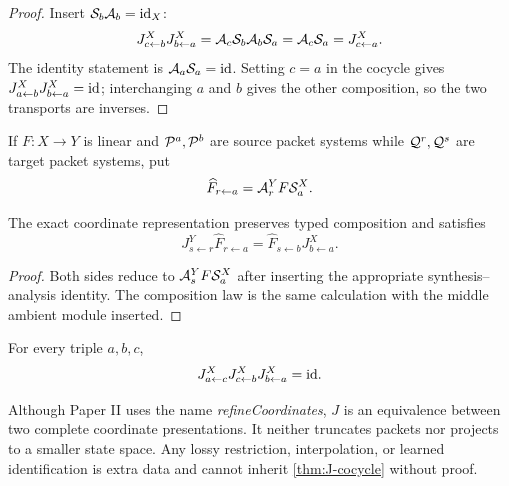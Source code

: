 \begin{proof}
Insert $\mathcal S_b\mathcal A_b=\mathrm{id}_X$:
\[
J^X_{c\leftarrow b}J^X_{b\leftarrow a}
=\mathcal A_c\mathcal S_b\mathcal A_b\mathcal S_a
=\mathcal A_c\mathcal S_a
=J^X_{c\leftarrow a}.
\]
The identity statement is $\mathcal A_a\mathcal S_a=\mathrm{id}$.  Setting $c=a$ in the cocycle
gives $J^X_{a\leftarrow b}J^X_{b\leftarrow a}=\mathrm{id}$; interchanging $a$ and $b$
gives the other composition, so the two transports are inverses.
\end{proof}

If $F:X\to Y$ is linear and $\mathcal P^a,\mathcal P^b$ are source packet systems while
$\mathcal Q^r,\mathcal Q^s$ are target packet systems, put
\[
\widehat F_{r\leftarrow a}
=
\mathcal A^Y_rF\mathcal S^X_a.
\]

\begin{theorem}
\label{thm:canonical-naturality}
The exact coordinate representation preserves typed composition and satisfies
\[
J^Y_{s\leftarrow r}\widehat F_{r\leftarrow a}
=
\widehat F_{s\leftarrow b}J^X_{b\leftarrow a}.
\]
\end{theorem}

\begin{proof}
Both sides reduce to $\mathcal A^Y_sF\mathcal S^X_a$ after inserting the appropriate
synthesis--analysis identity.  The composition law is the same calculation
with the middle ambient module inserted.
\end{proof}

\begin{corollary}
\label{cor:J-flat}
For every triple $a,b,c$,
\[
J^X_{a\leftarrow c}J^X_{c\leftarrow b}J^X_{b\leftarrow a}=\mathrm{id}.
\]
\end{corollary}

\begin{boundary}
Although Paper II uses the name \emph{refineCoordinates}, $J$ is an
equivalence between two complete coordinate presentations.  It neither
truncates packets nor projects to a smaller state space.  Any lossy
restriction, interpolation, or learned identification is extra data and
cannot inherit \cref{thm:J-cocycle} without proof.
\end{boundary}

